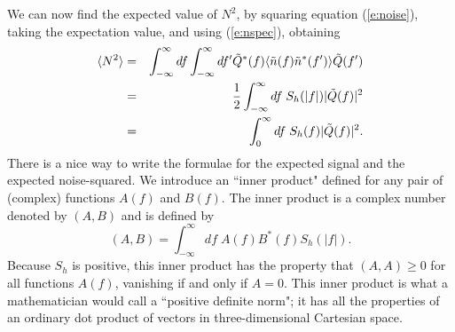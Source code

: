 We can now find the expected value of $N^2$, by squaring equation (\ref{e:noise}),
taking the expectation value, and using (\ref{e:nspec}), obtaining
\begin{eqnarray}
\nonumber
\langle N^2 \rangle &= & \int_{-\infty}^\infty df \int_{-\infty}^\infty
df' \tilde Q^*(f) \langle \tilde n(f)   \tilde n^*(f') \rangle \tilde
Q(f') \\
\nonumber
& = & {1 \over 2} \int_{-\infty}^\infty df \; S_h(|f|) |\tilde Q(f) |^2\\
\label{e:n2}
& = &  \int_{0}^\infty df \; S_h(f) |\tilde Q(f) |^2.
\end{eqnarray}
There is a nice way to write the formulae for the expected signal and
the expected noise-squared.  We introduce an ``inner product" defined
for any pair of (complex) functions $A(f)$ and $B(f)$.  The inner
product is a complex number denoted by $(A,B)$ and is defined by
\begin{equation}
\label{e:definprod}
(A,B) = \int_{-\infty}^\infty df \; {A(f) B^*(f) S_h(|f|)}.
\end{equation}
Because $S_h$ is positive, this inner product has the property that $(A,A)
\ge 0$ for all functions $A(f)$, vanishing if and only if $A=0$.  This
inner product is what a mathematician would call a ``positive definite
norm"; it has all the properties of an ordinary dot product of vectors
in three-dimensional Cartesian space.

